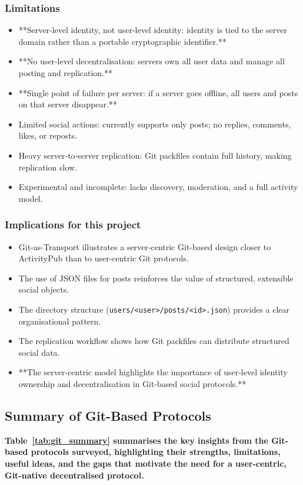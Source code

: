 \subsubsection*{Limitations}
\begin{itemize}
    \item **Server‑level identity, not user‑level identity: identity is tied to the server domain rather than a portable cryptographic identifier.**
    \item **No user‑level decentralisation: servers own all user data and manage all posting and replication.**
    \item **Single point of failure per server: if a server goes offline, all users and posts on that server disappear.**
    \item Limited social actions: currently supports only posts; no replies, comments, likes, or reposts.
    \item Heavy server‑to‑server replication: Git packfiles contain full history, making replication slow.
    \item Experimental and incomplete: lacks discovery, moderation, and a full activity model.
\end{itemize}

\subsubsection*{Implications for this project}
\begin{itemize}
    \item Git‑as‑Transport illustrates a server‑centric Git‑based design closer to ActivityPub than to user‑centric Git protocols.
    \item The use of JSON files for posts reinforces the value of structured, extensible social objects.
    \item The directory structure (\texttt{users/<user>/posts/<id>.json}) provides a clear organisational pattern.
    \item The replication workflow shows how Git packfiles can distribute structured social data.
    \item **The server‑centric model highlights the importance of user‑level identity ownership and decentralisation in Git‑based social protocols.**
\end{itemize}

\subsection*{Summary of Git-Based Protocols}
\textbf{Table~\ref{tab:git_summary} summarises the key insights from the Git-based protocols
surveyed, highlighting their strengths, limitations, useful ideas, and the gaps that motivate the
need for a user-centric, Git-native decentralised protocol.}

